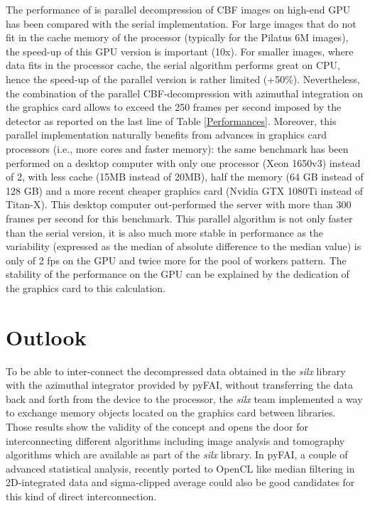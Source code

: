 \documentclass[preprint]{iucr}              %
\begin{document}
The performance of is parallel decompression of CBF images on high-end GPU has
been compared with the serial implementation. 
For large images that do not fit in the cache memory of the
processor (typically for the Pilatus 6M images), the speed-up of this GPU
version is important (10x).
For smaller images, where data fits in the processor cache, the serial
algorithm performs great on CPU, hence the speed-up of the parallel version is
rather limited (+50\%). 
Nevertheless, the combination of the parallel CBF-decompression with azimuthal
integration on the graphics card allows to exceed the 250 frames per second
imposed by the detector as reported on the last line of Table
\ref{Performances}.
Moreover, this parallel implementation naturally benefits from advances in
graphics card processors (i.e., more cores and faster memory):
the same benchmark has been performed on a desktop computer with only one
processor (Xeon 1650v3) instead of 2, with less cache (15MB instead of 20MB),
half the memory (64 GB instead of 128 GB) and a more recent cheaper graphics card
(Nvidia GTX 1080Ti instead of Titan-X).
This desktop computer out-performed the server with more than
300 frames per second for this benchmark.
This parallel algorithm is not only faster than the serial version, it is also
much more stable in performance as the variability (expressed
as the median of absolute difference to the median value) is only of 2 fps on 
the GPU and twice more for the pool of workers pattern. 
The stability of the performance on the GPU can be explained by the dedication
of the graphics card to this calculation.

\section{Outlook}

To be able to inter-connect the decompressed data obtained in the \textit{silx}
library with the azimuthal integrator provided by pyFAI, without transferring the data
back and forth from the device to the processor, the \textit{silx} team implemented a
way to exchange memory objects located on the graphics card between libraries. 
Those results show the validity of the concept and opens the door for
interconnecting different algorithms including image analysis and
tomography algorithms which are available as part of the \textit{silx} library.
In pyFAI, a couple of advanced statistical analysis, recently ported to
OpenCL like median filtering in 2D-integrated data and sigma-clipped
average could also be good candidates for this kind of direct interconnection.
\end{document}
